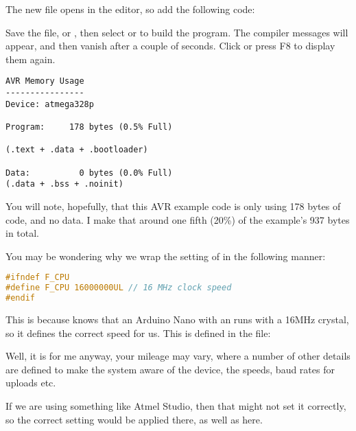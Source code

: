 The new file opens in the editor, so add the following code:



Save the file,  or , then select
 or  to build the program. The
compiler messages will appear, and then vanish after a couple of
seconds. Click  or press F8
to display them again.

\begin{lstlisting}[numbers={none},caption={AVR Blink Memory Usage}]
AVR Memory Usage
----------------
Device: atmega328p

Program:     178 bytes (0.5% Full)

(.text + .data + .bootloader)

Data:          0 bytes (0.0% Full)
(.data + .bss + .noinit)\end{lstlisting}

You will note, hopefully, that this AVR example code is only using 178 bytes of code, and no data. I make that around one fifth (20\%) of the   example's 937 bytes in total.

You may be wondering why we wrap the setting of  in the following manner:

\begin{lstlisting}[language=C,firstnumber=2,caption={Wrapping F\_CPU in AVRBlink.c}]
#ifndef F_CPU
#define F_CPU 16000000UL // 16 MHz clock speed
#endif
\end{lstlisting}

This is because  knows that an Arduino Nano with an  runs with a 16MHz crystal, so it defines the correct speed for us. This is defined in the file:


Well, it is for me anyway, your mileage may vary, where a number of other details are defined to make the system aware of the device, the speeds, baud rates for uploads etc.

If we are using something like Atmel Studio, then that might not set it correctly, so the correct setting would be applied there, as well as here.


